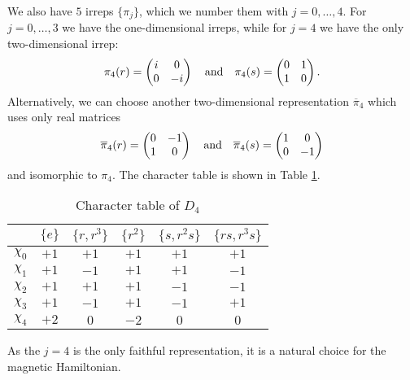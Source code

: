 We also have $5$ irreps $\{\pi_j\}$, which we number them with $j=0, \dots, 4$.
For $j=0, \dots,3$ we have the one-dimensional irreps, while for $j=4$ we have the only two-dimensional irrep:
\begin{equation}
    \pi_4(r) =
    \begin{pmatrix}
        i & 0 \\ 0 & -i
    \end{pmatrix}
    \qand
    \pi_4(s) =
    \begin{pmatrix}
        0 & 1 \\ 1 & 0
    \end{pmatrix}.
\end{equation}
Alternatively, we can choose another two-dimensional representation $\overline{\pi}_4$ which uses only real matrices
\begin{equation}
    \overline{\pi}_4(r) =
    \begin{pmatrix}
        0 & -1 \\ 1 & 0
    \end{pmatrix}
    \qand
    \overline{\pi}_4(s) =
    \begin{pmatrix}
        1 & 0 \\ 0 & -1
    \end{pmatrix}
\end{equation}
and isomorphic to $\pi_4$.
The character table is shown in Table \ref{tab:chars_D4}.

\begin{table}[t]
    \centering
    \begin{tabular}{cccccc}
        \toprule
         &  $\{e\}$ & $\{r,r^3\}$ & $\{r^2\}$ & $\{s,r^2s\}$ & $\{rs,r^3s\}$ \\
        \midrule
        $\chi_0$ & $+1$ & $+1$ & $+1$  & $+1$ & $+1$ \\
        $\chi_1$ & $+1$ & $-1$ & $+1$  & $+1$ & $-1$ \\
        $\chi_2$ & $+1$ & $+1$ & $+1$  & $-1$ & $-1$ \\
        $\chi_3$ & $+1$ & $-1$ & $+1$  & $-1$ & $+1$ \\
        $\chi_4$ & $+2$ & $0$  & $-2$  & $0$  & $0$ \\
        \bottomrule
    \end{tabular}
    \caption{Character table of $D_4$}
    \label{tab:chars_D4}
\end{table}

As the $j=4$ is the only faithful representation, it is a natural choice for the magnetic Hamiltonian.
